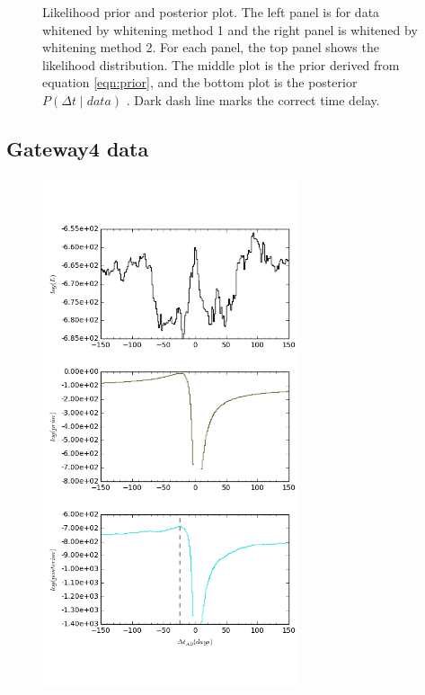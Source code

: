\documentclass[\docopts]{\docclass}
\begin{document}
\begin{figure}[!h]
\begin{minipage}[bottom]{0.4\textwidth}
  \end{minipage}
 \caption{Likelihood prior and posterior plot. The left panel is for data whitened by whitening method 1 and the right panel is whitened by whitening method 2. For each panel, the top panel shows the likelihood distribution. The middle plot is the prior derived from equation \ref{eqn:prior}, and the bottom plot is the posterior $P(\Delta t \mid data)$ . Dark dash line marks the correct time delay. }
\end{figure}
\newpage

\subsection{Gateway4 data}

\begin{figure}[!h]
  \centering
  \begin{minipage}[bottom]{0.4\textwidth}
\includegraphics[width=\textwidth, height=15cm, keepaspectratio]{whiten1/data4_full_log.png}
  \end{minipage}
  \hfill
  \begin{minipage}[bottom]{0.4\textwidth}

\end{minipage}
\end{figure}
\end{document}
